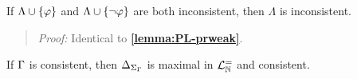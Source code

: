 \begin{Lthm} \label{lemma:conin}
  If $\Lambda \cup \lbrace\varphi\rbrace$ and $\Lambda\cup \lbrace\neg\varphi\rbrace$ are both inconsistent, then $\Lambda$ is inconsistent. 
\end{Lthm}

\begin{quote} 
  \textit{Proof:}
  Identical to \textbf{\ref{lemma:PL-prweak}}.
\end{quote}





\begin{Lthm} \label{lemma:max}
  If $\Gamma$ is consistent, then $\Delta_{\Sigma_{\Gamma}}$ is maximal in $\mathcal{L}^{=}_{\mathbb{N}}$ and consistent. 
\end{Lthm}

